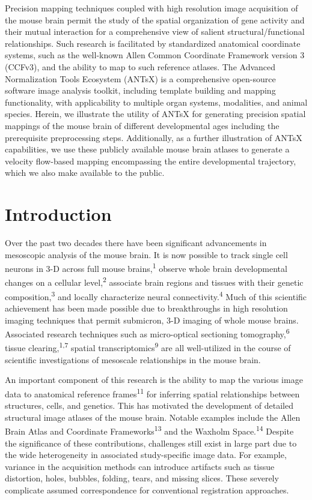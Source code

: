 \documentclass[
  12pt,
]{article}
\begin{document}
Precision mapping techniques coupled with high resolution image
acquisition of the mouse brain permit the study of the spatial
organization of gene activity and their mutual interaction for a
comprehensive view of salient structural/functional relationships. Such
research is facilitated by standardized anatomical coordinate systems,
such as the well-known Allen Common Coordinate Framework version 3
(CCFv3), and the ability to map to such reference atlases. The Advanced
Normalization Tools Ecosystem (ANTsX) is a comprehensive open-source
software image analysis toolkit, including template building and mapping
functionality, with applicability to multiple organ systems, modalities,
and animal species. Herein, we illustrate the utility of ANTsX for
generating precision spatial mappings of the mouse brain of different
developmental ages including the prerequisite preprocessing steps.
Additionally, as a further illustration of ANTsX capabilities, we use
these publicly available mouse brain atlases to generate a velocity
flow-based mapping encompassing the entire developmental trajectory,
which we also make available to the public.

\clearpage

\hypertarget{introduction}{%
\section*{Introduction}\label{introduction}}

Over the past two decades there have been significant advancements in
mesoscopic analysis of the mouse brain. It is now possible to track
single cell neurons in 3-D across full mouse brains,\textsuperscript{1}
observe whole brain developmental changes on a cellular
level,\textsuperscript{2} associate brain regions and tissues with their
genetic composition,\textsuperscript{3} and locally characterize neural
connectivity.\textsuperscript{4} Much of this scientific achievement has
been made possible due to breakthroughs in high resolution imaging
techniques that permit submicron, 3-D imaging of whole mouse brains.
Associated research techniques such as micro-optical sectioning
tomography,\textsuperscript{6} tissue clearing,\textsuperscript{1,7}
spatial transcriptomics\textsuperscript{9} are all well-utilized in the
course of scientific investigations of mesoscale relationships in the
mouse brain.

An important component of this research is the ability to map the
various image data to anatomical reference frames\textsuperscript{11}
for inferring spatial relationships between structures, cells, and
genetics. This has motivated the development of detailed structural
image atlases of the mouse brain. Notable examples include the Allen
Brain Atlas and Coordinate Frameworks\textsuperscript{13} and the
Waxholm Space.\textsuperscript{14} Despite the significance of these
contributions, challenges still exist in large part due to the wide
heterogeneity in associated study-specific image data. For example,
variance in the acquisition methods can introduce artifacts such as
tissue distortion, holes, bubbles, folding, tears, and missing slices.
These severely complicate assumed correspondence for conventional
registration approaches.
\end{document}
